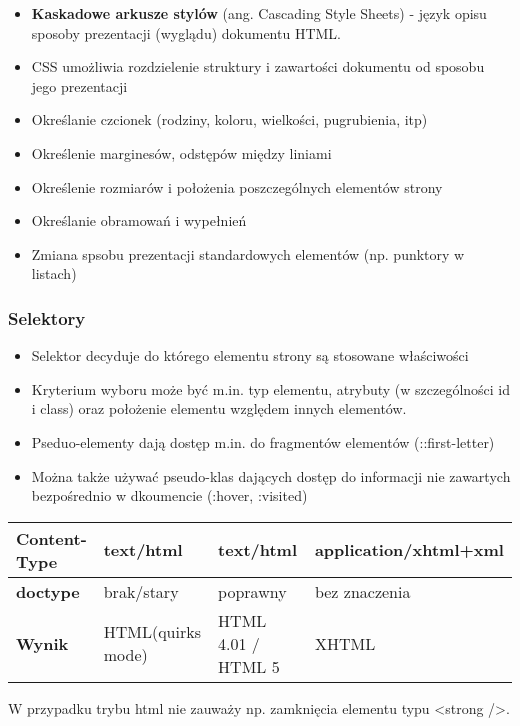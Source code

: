\documentclass[../main.tex]{subfiles}
\begin{document}
    \begin{itemize}
        \item \textbf{Kaskadowe arkusze stylów} (ang. Cascading Style Sheets) - język opisu sposoby prezentacji (wyglądu) dokumentu HTML.
        \item CSS umożliwia rozdzielenie struktury i zawartości dokumentu od sposobu jego prezentacji\\

        \item Określanie czcionek (rodziny, koloru, wielkości, pugrubienia, itp)
        \item Określenie marginesów, odstępów między liniami
        \item Określenie rozmiarów i położenia poszczególnych elementów strony
        \item Określanie obramowań i wypełnień
        \item Zmiana spsobu prezentacji standardowych elementów (np. punktory w listach)
    \end{itemize}


    \subsubsection{Selektory}




    \begin{itemize}
        \item Selektor decyduje do którego elementu strony są stosowane właściwości
        \item Kryterium wyboru może być m.in. typ elementu, atrybuty (w szczególności id i class) oraz położenie elementu względem innych elementów.
        \item Pseduo-elementy dają dostęp m.in. do fragmentów elementów (::first-letter)
        \item Można także używać pseudo-klas dających dostęp do informacji nie zawartych bezpośrednio w dkoumencie (:hover, :visited)
    \end{itemize}


    \begin{table}[H]
        \begin{center}
            \begin{tabular}{|p{4cm}|p{4cm}|p{4cm}|p{4cm}|}
                \hline
                \textbf{Content-Type} & text/html & text/html & application/xhtml+xml\\
                \hline
                \textbf{doctype} & brak/stary & poprawny & bez znaczenia\\
                \hline
                \textbf{Wynik} & HTML(quirks mode) & HTML 4.01 / HTML 5 & XHTML\\
                \hline
            \end{tabular}
        \end{center}
    \end{table}
    W przypadku trybu html nie zauważy np. zamknięcia elementu typu <strong />.
\end{document}
